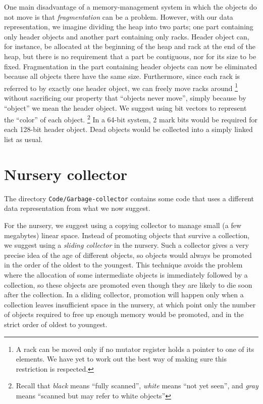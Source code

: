 One main disadvantage of a memory-management system in which the
objects do not move is that \emph{fragmentation} can be a problem.
However, with our data representation, we imagine dividing the heap
into two parts; one part containing only header objects and another
part containing only racks.  Header object can, for
instance, be allocated at the beginning of the heap and rack
at the end of the heap, but there is no requirement that a
part be contiguous, nor for its size to be fixed.  Fragmentation in
the part containing header objects can now be eliminated because all
objects there have the same size.  Furthermore, since each rack
is referred to by exactly one header object, we can freely move
racks around%
\footnote{A rack can be moved only if no mutator register
  holds a pointer to one of its elements.  We have yet to work out the
  best way of making sure this restriction is respected.}  
without sacrificing our property that ``objects never move'', simply
because by ``object'' we mean the header object.  We suggest using bit
vectors to represent the ``color'' of each object.%
\footnote{Recall that \emph{black} means ``fully scanned'', \emph{white}
  means ``not yet seen'', and \emph{gray} means ``scanned but may
  refer to white objects''}
In a 64-bit system, 2 mark bits would be required for each 128-bit
header object.  Dead objects would be collected into a simply linked
list as usual. 

\section{Nursery collector}
The directory \texttt{Code/Garbage-collector} contains some code that
uses a different data representation from what we now suggest.  

For the nursery, we suggest using a copying collector to manage small
(a few megabytes) linear space.  Instead of promoting objects that
survive a collection, we suggest using a \emph{sliding collector} in
the nursery.  Such a collector gives a very precise idea of the age of
different objects, so objects would always be promoted in the order of
the oldest to the youngest.  This technique avoids the problem where
the allocation of some intermediate objects is immediately followed by
a collection, so these objects are promoted even though they are
likely to die soon after the collection.  In a sliding collector,
promotion will happen only when a collection leaves insufficient space
in the nursery, at which point only the number of objects required to
free up enough memory would be promoted, and in the strict order of
oldest to youngest.

